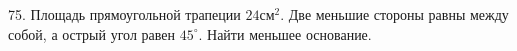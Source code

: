 75. Площадь прямоугольной трапеции $24\text{см}^2.$ Две меньшие стороны равны между собой, а острый угол равен $45^\circ.$ Найти меньшее основание.\\
